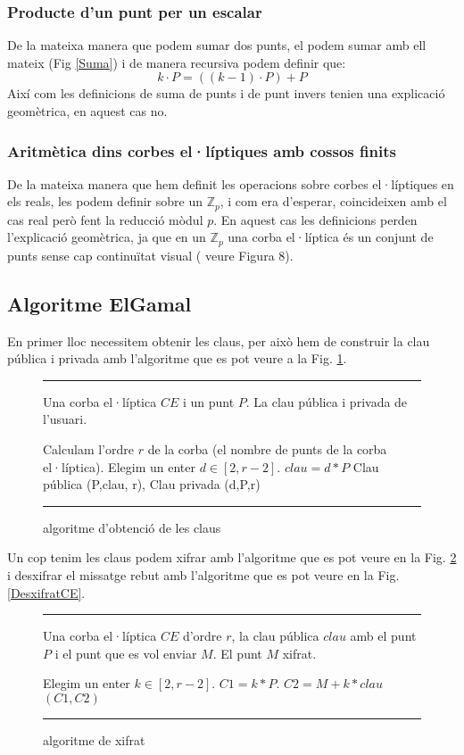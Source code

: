 \documentclass[journal]{IEEEtran}
\begin{document}
\subsubsection{Producte d'un punt per un escalar}
De la mateixa manera que podem sumar dos punts, el podem sumar amb ell mateix (Fig \ref{Suma}) i de manera recursiva podem definir que:
\[
k \cdot P = ((k-1) \cdot P )+ P
\]
Així com les definicions de suma de punts i de punt invers tenien una explicació geomètrica, en aquest cas no.

\subsubsection{Aritmètica dins corbes el·líptiques amb cossos finits}
De la mateixa manera que hem definit les operacions sobre corbes el·líptiques en els reals, les podem definir sobre un $\mathbb{Z}_p$, i com era d'esperar, coincideixen amb el cas real però fent la reducció mòdul $p$. En aquest cas les definicions perden l'explicació geomètrica, ja que en un $\mathbb{Z}_p$ una corba el·líptica és un conjunt de punts sense cap continuïtat visual ( veure Figura 8).
\subsection{Algoritme ElGamal}
En primer lloc necessitem obtenir les claus, per això hem de construir la clau pública i privada amb l'algoritme que es pot veure a la Fig. \ref{alg:CE}.
\begin{figure}[h!]
\hrule
\hspace*{2pt}
\begin{algorithmic}[1]
	\REQUIRE Una corba el·líptica $CE$ i un punt $P$.
	\ENSURE La clau pública i privada de l'usuari.
	
	\medskip
	\STATE Calculam l'ordre $r$ de la corba (el nombre de punts de la corba el·líptica).
	\STATE Elegim un enter $d\in [ 2 , r-2]$.
	\STATE $clau=d*P$
	\RETURN Clau pública (P,clau, r), Clau privada (d,P,r)
\end{algorithmic}
\hrule
\caption{algoritme d'obtenció de les claus}\label{alg:CE}
\end{figure}
Un cop tenim les claus podem xifrar amb l'algoritme que es pot veure en la Fig. \ref{XifratCE} i desxifrar el missatge rebut amb l'algoritme que es pot veure en la Fig. \ref{DesxifratCE}.
\begin{figure}
\hrule
\hspace*{2pt}
\begin{algorithmic}[1]
	\REQUIRE Una corba el·líptica $CE$ d'ordre $r$, la clau pública $clau$ amb el punt $P$ i el punt que es vol enviar $M$.
	\ENSURE El punt $M$ xifrat.
	
	\medskip
	\STATE Elegim un enter $k \in [2, r-2]$.
	\STATE $C1=k*P$.
	\STATE $C2=M+k*clau$
	\RETURN $(C1,C2)$
\end{algorithmic}
\hrule
\caption{algoritme de xifrat}\label{XifratCE}
\end{figure}
\end{document}
